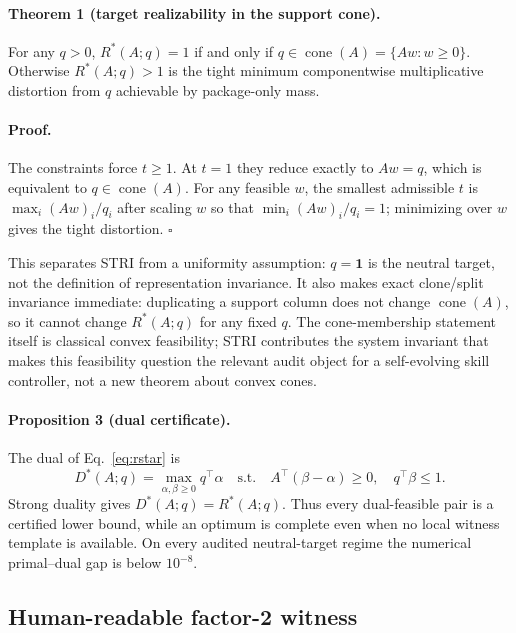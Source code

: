 \paragraph{Theorem 1 (target realizability in the support cone).}
For any $q>0$, $R^*(A;q)=1$ if and only if $q\in\operatorname{cone}(A)=\{Aw:w\ge0\}$. Otherwise $R^*(A;q)>1$ is the tight minimum componentwise multiplicative distortion from $q$ achievable by package-only mass.

\paragraph{Proof.}
The constraints force $t\ge1$. At $t=1$ they reduce exactly to $Aw=q$, which is equivalent to $q\in\operatorname{cone}(A)$. For any feasible $w$, the smallest admissible $t$ is $\max_i (Aw)_i/q_i$ after scaling $w$ so that $\min_i(Aw)_i/q_i=1$; minimizing over $w$ gives the tight distortion. \hfill$\square$

This separates STRI from a uniformity assumption: $q=\mathbf1$ is the neutral target, not the definition of representation invariance. It also makes exact clone/split invariance immediate: duplicating a support column does not change $\operatorname{cone}(A)$, so it cannot change $R^*(A;q)$ for any fixed $q$. The cone-membership statement itself is classical convex feasibility; STRI contributes the system invariant that makes this feasibility question the relevant audit object for a self-evolving skill controller, not a new theorem about convex cones.

\paragraph{Proposition 3 (dual certificate).}
The dual of Eq.~\eqref{eq:rstar} is
\begin{equation}
\label{eq:dual}
D^*(A;q)=\max_{\alpha,\beta\ge0}q^\top\alpha
\quad\text{s.t.}\quad
A^\top(\beta-\alpha)\ge0,\quad q^\top\beta\le1.
\end{equation}
Strong duality gives $D^*(A;q)=R^*(A;q)$. Thus every dual-feasible pair is a certified lower bound, while an optimum is complete even when no local witness template is available. On every audited neutral-target regime the numerical primal--dual gap is below $10^{-8}$.

\subsection{Human-readable factor-2 witness}
